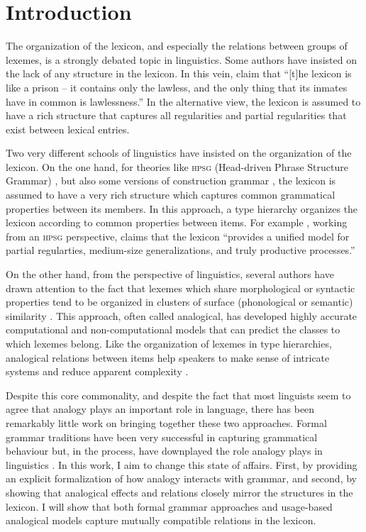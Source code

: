 \chapter{Introduction}\label{chap:introduction}
\largerpage
The organization of the lexicon, and especially the relations between groups of lexemes, is a strongly debated topic in linguistics. Some authors have insisted on the lack of any structure in the lexicon.
In this vein, \textcite[3]{DiSciullo.1987} claim that ``[t]he lexicon is like a prison -- it contains only the lawless, and the only thing that its inmates have in common is lawlessness.''
In the alternative view, the lexicon is assumed to have a rich structure that captures all regularities and partial regularities that exist between lexical entries.

Two very different schools of linguistics have insisted on the organization of the lexicon.
On the one hand, for theories like \textsc{hpsg} (Head-driven Phrase Structure Grammar) \autocite{Pollard.1994}, but also some versions of construction grammar \autocite{Fillmore.1995}, the lexicon is assumed to have a very rich structure which captures common grammatical properties between its members.
In this approach, a type hierarchy organizes the lexicon according to common properties between items.
For example \textcite[4, among others]{Koenig.1999}, working from an \textsc{hpsg} perspective, claims that the lexicon ``provides a unified model for partial regularties, medium-size generalizations, and truly productive processes.''

On the other hand, from the perspective of  linguistics, several authors have drawn attention to the fact that lexemes which share morphological or syntactic properties tend to be organized in clusters of surface (phonological or semantic) similarity \autocites{Bybee.1982, Eddington.1996, Skousen.1989}.
This approach, often called analogical, has developed highly accurate computational and non-computational models that can predict the classes to which lexemes belong.
Like the organization of lexemes in type hierarchies, analogical relations between items help speakers to make sense of intricate systems and reduce apparent complexity \autocite{Kopcke.1984}.

\largerpage
Despite this core commonality, and despite the fact that most linguists seem to agree that analogy plays an important role in language, there has been remarkably little work on bringing together these two approaches.
Formal grammar traditions have been very successful in capturing grammatical behaviour but, in the process, have downplayed the role analogy plays in linguistics \autocite{Anderson.2015}.
In this work, I aim to change this state of affairs.
First, by providing an explicit formalization of how analogy interacts with grammar, and second, by showing that analogical effects and relations closely mirror the structures in the lexicon.
I will show that both formal grammar approaches and usage-based analogical models capture mutually compatible relations in the lexicon.

